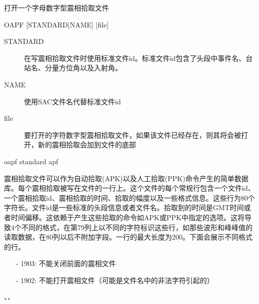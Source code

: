 \label{cmd:oapf}

打开一个字母数字型震相拾取文件

\begin{SACSTX}
OAPF [STANDARD|NAME] [file]
\end{SACSTX}

\begin{description}
\item [STANDARD] 在写震相拾取文件时使用标准文件id。标准文件id包含了头段中事件名、台站名、分量方位角以及入射角。 
\item [NAME] 使用SAC文件名代替标准文件id 
\item [file] 要打开的字符数字型震相拾取文件，如果该文件已经存在，则其将会被打开，新的震相拾取会加到文件的底部 
\end{description}

\begin{SACDFT}
oapf standard apf
\end{SACDFT}

震相拾取文件可以作为自动拾取(APK)以及人工拾取(PPK)命令产生的简单数据库。每个震相拾取被写在文件的一行上。这个文件的每个常规行包含一个文件id、一个震相拾取id、震相拾取的时间、拾取的幅度以及一些格式信息。这些行为80个字符长。文件id是一些标准的头段信息或者文件名。拾取到的时间是GMT时间或者时间偏移。这依赖于产生这些拾取的命令如APK或PPK中指定的选项。这将导致4个不同的格式，在第79列上以不同的字符标识这些行，如那些波形和峰峰值的读取数据，在80列以后不附加字段。一行的最大长度为200。下面会展示不同格式的行。

\begin{itemize}
\item[-]1903: 不能关闭前面的震相文件
\item[-]1902: 不能打开震相文件（可能是文件名中的非法字符引起的）
\end{itemize}

、、

